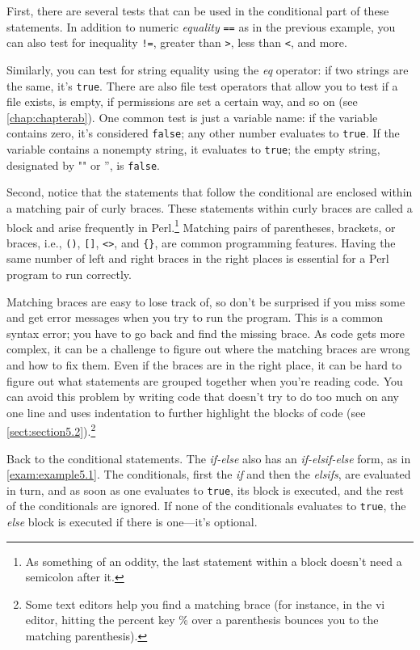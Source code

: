 First, there are several tests that can be used in the conditional part of these statements. In addition to numeric \textit{equality} \verb|==| as in the previous example, you can also test for inequality \verb|!=|, greater than \verb|>|, less than \verb|<|, and more.

Similarly, you can test for string equality using the \textit{eq} operator: if two strings are the same, it's \verb|true|. There are also file test operators that allow you to test if a file exists, is empty, if permissions are set a certain way, and so on (see \autoref{chap:chapterab}). One common test is just a variable name: if the variable contains zero, it's considered \verb|false|; any other number evaluates to \verb|true|. If the variable contains a nonempty string, it evaluates to \verb|true|; the empty string, designated by "" or '', is \verb|false|.

Second, notice that the statements that follow the conditional are enclosed within a matching pair of curly braces. These statements within curly braces are called a block and arise frequently in Perl.\footnote{As something of an oddity, the last statement within a block doesn't need a semicolon after it.} Matching pairs of parentheses, brackets, or braces, i.e., \verb|()|, \verb|[]|, \verb|<>|, and \verb|{}|, are common programming features. Having the same number of left and right braces in the right places is essential for a Perl program to run correctly.

Matching braces are easy to lose track of, so don't be surprised if you miss some and get error messages when you try to run the program. This is a common syntax error; you have to go back and find the missing brace. As code gets more complex, it can be a challenge to figure out where the matching braces are wrong and how to fix them. Even if the braces are in the right place, it can be hard to figure out what statements are grouped together when you're reading code. You can avoid this problem by writing code that doesn't try to do too much on any one line and uses indentation to further highlight the blocks of code (see \autoref{sect:section5.2}).\footnote{Some text editors help you find a matching brace (for instance, in the vi editor, hitting the percent key \% over a parenthesis bounces you to the matching parenthesis).} 

Back to the conditional statements. The \textit{if-else} also has an \textit{if-elsif-else} form, as in \autoref{exam:example5.1}. The conditionals, first the \textit{if} and then the \textit{elsifs}, are evaluated in turn, and as soon as one evaluates to \verb|true|, its block is executed, and the rest of the conditionals are ignored. If none of the conditionals evaluates to \verb|true|, the \textit{else} block is executed if there is one—it's optional. 

